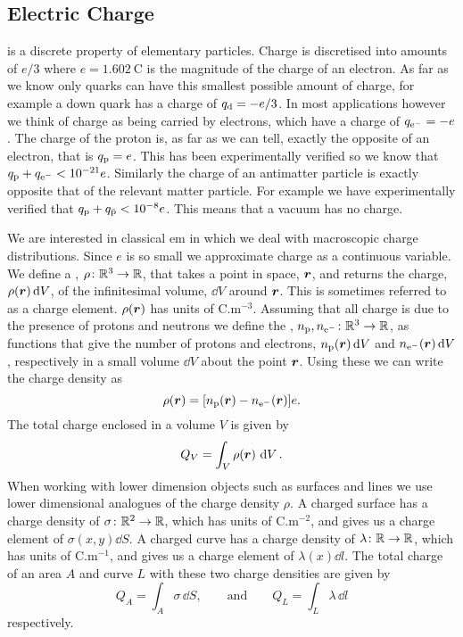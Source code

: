     \subsection{Electric Charge}
     is a discrete property of elementary particles.
    Charge is discretised into amounts of \(e/3\) where \(e = \SI{1.602}{\coulomb}\) is the magnitude of the charge of an electron.
    As far as we know only quarks can have this smallest possible amount of charge, for example a down quark has a charge of \(q_{\mathrm{d}} = -e/3\).
    In most applications however we think of charge as being carried by electrons, which have a charge of \(q_{\mathrm{e}^-} = -e\).
    The charge of the proton is, as far as we can tell, exactly the opposite of an electron, that is \(q_{\mathrm{p}} = e\).
    This has been experimentally verified so we know that \(q_{\mathrm{p}} + q_{\mathrm{e}^-} < \num{e-21}e\).
    Similarly the charge of an antimatter particle is exactly opposite that of the relevant matter particle.
    For example we have experimentally verified that \(q_{\mathrm{p}} + q_{\bar{\mathrm{p}}} < \num{e-8}e\).
    This means that a vacuum has no charge.
    
    We are interested in classical \acrfull{em} in which we deal with macroscopic charge distributions.
    Since \(e\) is so small we approximate charge as a continuous variable.
    We define a , \(\rho\colon\mathbb{R}^3\to\mathbb{R}\), that takes a point in space, \(\bm{r}\), and returns the charge, \(\rho(\bm{r})\dd{V}\), of the infinitesimal volume, \(\dd{V}\) around \(\bm{r}\).
    This is sometimes referred to as a charge element.
    \(\rho(\bm{r})\) has units of \(\si{\coulomb.\metre^{-3}}\).
    Assuming that all charge is due to the presence of protons and neutrons we define the , \(n_{\mathrm{p}}, n_{\mathrm{e}^-}\colon\mathbb{R}^3\to\mathbb{R}\), as functions that give the number of protons and electrons, \(n_{\mathrm{p}}(\bm{r})\dd{V}\) and \(n_{\mathrm{e}^-}(\bm{r})\dd{V}\), respectively in a small volume \(\dd{V}\) about the point \(\bm{r}\).
    Using these we can write the charge density as
    \[\rho(\bm{r}) = [n_{\mathrm{p}}(\bm{r}) - n_{\mathrm{e}^-}(\bm{r})]e.\]
    The total charge enclosed in a volume \(V\) is given by
    \[Q_V = \int_V\rho(\bm{r})\,\dd{V}.\]
    When working with lower dimension objects such as surfaces and lines we use lower dimensional analogues of the charge density \(\rho\).
    A charged surface has a charge density of \(\sigma\colon\mathbb{R}^2\to\mathbb{R}\), which has units of \(\si{\coulomb.\metre^{-2}}\), and gives us a charge element of \(\sigma(x, y)\dd{S}\).
    A charged curve has a charge density of \(\lambda\colon\mathbb{R}\to\mathbb{R}\), which has units of \(\si{\coulomb.\metre^{-1}}\), and gives us a charge element of \(\lambda(x)\dd{l}\).
    The total charge of an area \(A\) and curve \(L\) with these two charge densities are given by
    \[Q_A = \int_A\sigma\,\dd{S},\qquad\text{and}\qquad Q_L = \int_L\lambda\,\dd{l}\]
    respectively.
    
